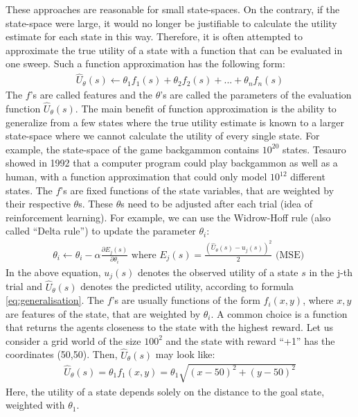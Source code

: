 \documentclass{llncs}
\begin{document}
These approaches are reasonable for small state-spaces.
On the contrary, if the state-space were large, it would no longer be justifiable to calculate the utility estimate for each state in this way. Therefore, it is often attempted to approximate the true utility of a state with a function that can be evaluated in one sweep. Such a function approximation has the following form:
\begin{align*}\label{eq:generalisation}
	\hat{U}_{\theta}(s)\leftarrow \theta_1f_1(s)+\theta_2f_2(s)+...+\theta_nf_n(s)
\end{align*}
The $f$’s are called features and the $\theta$’s are called the parameters of the evaluation function $\hat{U}_{\theta}(s)$. The main benefit of function approximation is the ability to generalize from a few states where the true utility estimate is known to a larger state-space where we cannot calculate the utility of every single state. For example, the state-space of the game backgammon contains $10^{20}$ states. Tesauro~\cite{Tesauro} showed in 1992 that a computer program could play backgammon as well as a human, with a function approximation that could only model $10^{12}$ different states. The $f$’s are fixed functions of the state variables, that are weighted by their respective $\theta$s. These $\theta$s need to be adjusted after each trial (idea of reinforcement learning). For example, we can use the
Widrow-Hoff rule (also called ``Delta rule'') to update the parameter $\theta_i$:
\begin{align*}
	\theta_i \leftarrow \theta_i-\alpha\frac{\partial E_j(s)}{\partial\theta_i} \text{ where }E_j(s)=\frac{(\hat{U}_{\theta}(s)-u_j(s))^2}{2}\text{ (MSE) } 
\end{align*}
In the above equation, $u_j(s)$ denotes the observed utility of a state $s$ in the j-th trial and $\hat{U}_{\theta}(s)$ denotes the predicted utility, according to formula \ref{eq:generalisation}. The $f$’s are usually functions of the form $f_i(x,y)$, where $x,y$ are features of the state, that are weighted by $\theta_i$. A common choice is a function that returns the agents closeness to the state with the highest reward. Let us consider a grid world of the size $100^2$ and the state with reward “+1” has the coordinates (50,50). Then, $\hat{U}_{\theta}(s)$ may look like:
\begin{align*}
	\hat{U}_{\theta}(s)=\theta_1f_1(x,y)=\theta_1\sqrt{(x-50)^2+(y-50)^2}
\end{align*}
Here, the utility of a state depends solely on the distance to the goal state, weighted with $\theta_1$.
\end{document}
